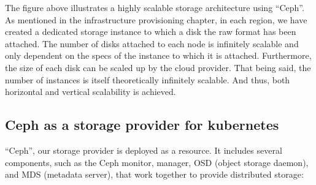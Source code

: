 The figure above illustrates a highly scalable storage architecture using “Ceph”. As mentioned in the infrastructure provisioning chapter, in each region, we have created a dedicated storage instance to which a disk the raw format has been attached. The number of disks attached to each node is infinitely scalable and only dependent on the specs of the instance to which it is attached. Furthermore, the size of each disk can be scaled up by the cloud provider. That being said, the number of instances is itself theoretically infinitely scalable. And thus, both horizontal and vertical scalability is achieved. 

\subsection{Ceph as a storage provider for kubernetes }

“Ceph”, our storage provider is deployed as a resource. It includes several components, such as the Ceph monitor, manager, OSD (object storage daemon), and MDS (metadata server), that work together to provide distributed storage: 

